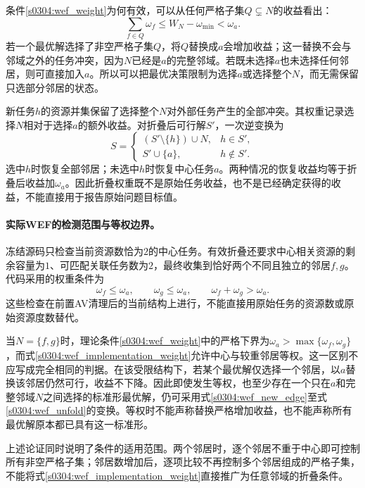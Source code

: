 条件\eqref{s0304:wef_weight}为何有效，可以从任何严格子集$Q\subsetneq N$的收益看出：
\begin{equation}
 \sum_{f\in Q}\omega_f\leq W_N-\omega_{\min}<\omega_a.
 \label{s0304:wef_proper_subset}
\end{equation}
若一个最优解选择了非空严格子集$Q$，将$Q$替换成$a$会增加收益；这一替换不会与邻域之外的任务冲突，因为$N$已经是$a$的完整邻域。若既未选择$a$也未选择任何邻居，则可直接加入$a$。所以可以把最优决策限制为选择$a$或选择整个$N$，而无需保留只选部分邻居的状态。

新任务$h$的资源并集保留了选择整个$N$对外部任务产生的全部冲突。其权重记录选择$N$相对于选择$a$的额外收益。对折叠后可行解$S'$，一次逆变换为
\begin{equation}
 S=\begin{cases}
 (S'\setminus\{h\})\cup N, &h\in S',\\
 S'\cup\{a\}, &h\notin S'.
 \end{cases}
 \label{s0304:wef_unfold}
\end{equation}
选中$h$时恢复全部邻居；未选中$h$时恢复中心任务$a$。两种情况的恢复收益均等于折叠后收益加$\omega_a$。因此折叠权重既不是原始任务收益，也不是已经确定获得的收益，不能直接用于报告原始问题目标值。

\paragraph{实际WEF的检测范围与等权边界。}
冻结源码只检查当前资源数恰为$2$的中心任务。有效折叠还要求中心相关资源的剩余容量为$1$、可匹配关联任务数为$2$，最终收集到恰好两个不同且独立的邻居$f,g$。代码采用的权重条件为
\begin{equation}
 \omega_f\leq\omega_a,\qquad
 \omega_g\leq\omega_a,\qquad
 \omega_f+\omega_g>\omega_a.
 \label{s0304:wef_implementation_weight}
\end{equation}
这些检查在前置AV清理后的当前结构上进行，不能直接用原始任务的资源数或原始资源度数替代。

当$N=\{f,g\}$时，理论条件\eqref{s0304:wef_weight}中的严格下界为$\omega_a>\max\{\omega_f,\omega_g\}$，而式\eqref{s0304:wef_implementation_weight}允许中心与较重邻居等权。这一区别不应写成完全相同的判据。在该受限结构下，若某个最优解仅选择一个邻居，以$a$替换该邻居仍然可行，收益不下降。因此即使发生等权，也至少存在一个只在$a$和完整邻域$N$之间选择的标准形最优解，仍可采用式\eqref{s0304:wef_new_edge}至式\eqref{s0304:wef_unfold}的变换。等权时不能声称替换严格增加收益，也不能声称所有最优解原本都已具有这一标准形。

上述论证同时说明了条件的适用范围。两个邻居时，逐个邻居不重于中心即可控制所有非空严格子集；邻居数增加后，逐项比较不再控制多个邻居组成的严格子集，不能将式\eqref{s0304:wef_implementation_weight}直接推广为任意邻域的折叠条件。

